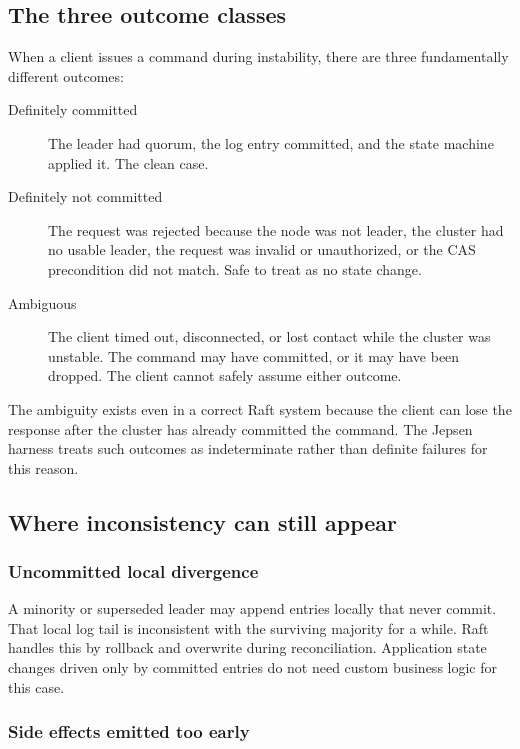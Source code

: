 \subsection{The three outcome classes}

When a client issues a command during instability, there are three
fundamentally different outcomes:

\begin{description}
\item[Definitely committed] The leader had quorum, the log entry committed,
and the state machine applied it. The clean case.
\item[Definitely not committed] The request was rejected because the node
was not leader, the cluster had no usable leader, the request was invalid
or unauthorized, or the CAS precondition did not match. Safe to treat as no
state change.
\item[Ambiguous] The client timed out, disconnected, or lost contact while
the cluster was unstable. The command may have committed, or it may have
been dropped. The client cannot safely assume either outcome.
\end{description}

The ambiguity exists even in a correct Raft system because the client can
lose the response after the cluster has already committed the command. The
Jepsen harness treats such outcomes as indeterminate rather than definite
failures for this reason.

\subsection{Where inconsistency can still appear}

\subsubsection{Uncommitted local divergence}

A minority or superseded leader may append entries locally that never
commit. That local log tail is inconsistent with the surviving majority
for a while. Raft handles this by rollback and overwrite during
reconciliation. Application state changes driven only by committed entries
do not need custom business logic for this case.

\subsubsection{Side effects emitted too early}

